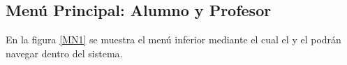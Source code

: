 \hypertarget{menu:MenuPrincipal}{}	
\subsection{Menú Principal: Alumno y Profesor}
En la figura \ref{MN1} se muestra el menú inferior mediante el cual el  y el  podrán navegar dentro del sistema.
